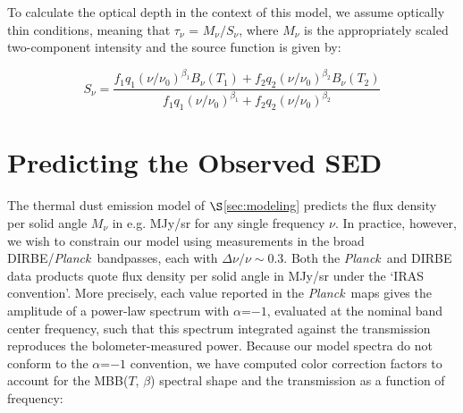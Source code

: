 \documentclass{emulateapj}
\newcommand{\PLANCK}{{\it Planck}}
\begin{document}




To calculate the optical depth in the context of this model, we assume
optically thin conditions, meaning that $\tau_{\nu}$ = $M_{\nu}/S_{\nu}$, where
$M_{\nu}$ is the appropriately scaled two-component intensity and the source
function is given by:

\begin{equation}
\label{eqn:source}
S_{\nu} = \frac{f_1q_1(\nu/\nu_0)^{\beta_1}B_{\nu}(T_1) + f_2q_2(\nu/\nu_0)^{\beta_2}B_{\nu}(T_2)}{f_1q_1(\nu/\nu_0)^{\beta_1}+f_2q_2(\nu/\nu_0)^{\beta_2}}
\end{equation}

\section{Predicting the Observed SED}
\label{sec:bpcorr}

The thermal dust emission model of $\S$\ref{sec:modeling} predicts the 
flux density per solid angle $M_{\nu}$ in e.g. MJy/sr for any single frequency 
$\nu$. In practice, however, we wish to constrain our model using measurements 
in the broad DIRBE/\PLANCK~bandpasses, each with $\Delta\nu/\nu\sim0.3$. 
Both the \PLANCK~and DIRBE data products quote flux density per solid 
angle in MJy/sr under the `IRAS convention'. More precisely, each value 
reported in the \PLANCK~maps gives the amplitude of a power-law spectrum 
with $\alpha$=$-1$, evaluated at the nominal band center frequency, such that 
this spectrum integrated against the transmission reproduces the 
bolometer-measured power. Because our model spectra do not conform to the 
$\alpha$=$-1$ convention, we have computed color correction factors to account 
for the MBB($T$, $\beta$) spectral shape and the transmission as a function of 
frequency:
\end{document}
